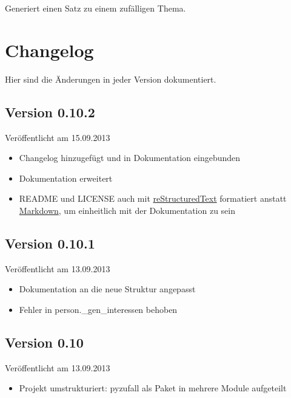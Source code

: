 \documentclass[a4paper,12pt,oneside]{sphinxmanual}
\begin{document}

\begin{fulllineitems}
\label{module:pyzufall.satz.satz_thema}
Generiert einen Satz zu einem zufälligen Thema.

\end{fulllineitems}



\chapter{Changelog}
\label{changelog::doc}\label{changelog:changelog}
Hier sind die Änderungen in jeder Version dokumentiert.


\section{Version 0.10.2}
\label{changelog:version-0-10-2}
Veröffentlicht am 15.09.2013
\begin{itemize}
\item {} 
Changelog hinzugefügt und in Dokumentation eingebunden

\item {} 
Dokumentation erweitert

\item {} 
README und LICENSE auch mit \href{http://de.wikipedia.org/wiki/ReStructuredText}{reStructuredText} formatiert anstatt \href{http://de.wikipedia.org/wiki/Markdown}{Markdown}, um einheitlich mit der Dokumentation zu sein

\end{itemize}


\section{Version 0.10.1}
\label{changelog:version-0-10-1}
Veröffentlicht am 13.09.2013
\begin{itemize}
\item {} 
Dokumentation an die neue Struktur angepasst

\item {} 
Fehler in person.\_gen\_interessen behoben

\end{itemize}


\section{Version 0.10}
\label{changelog:version-0-10}
Veröffentlicht am 13.09.2013
\begin{itemize}
\item {} 
Projekt umstrukturiert: pyzufall als Paket in mehrere Module aufgeteilt

\end{itemize}
\end{document}
